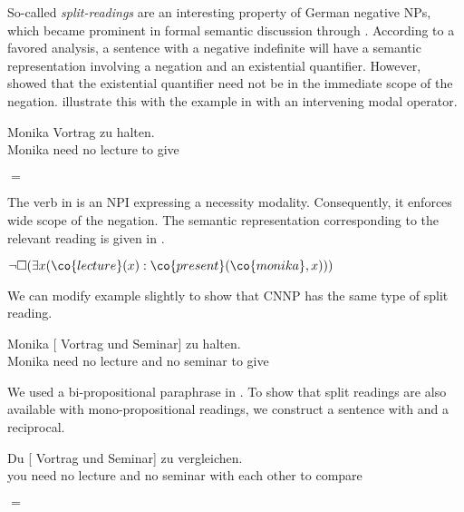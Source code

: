 \documentclass[output=paper]{langsci/langscibook}
\begin{document}
So-called \emph{split-readings} are an interesting property of German negative NPs, which became prominent in formal semantic discussion through \citet{Jacobs:80}. 
According to a favored analysis, a sentence with a negative indefinite will have a semantic representation involving a negation and an existential quantifier. 
However, \citet{Jacobs:80} showed that the existential quantifier need not be in the immediate scope of the negation. \citet{Penka:Stechow:01} illustrate this with the example in  with an intervening modal operator.

\ea \label{ex-tie}
\gll Monika   Vortrag zu halten.\\
Monika need no lecture to give\\
\glt {}\\
$=$ 
\z 

The verb  in  is an NPI expressing a necessity modality. Consequently, it enforces wide scope of the negation. The semantic representation corresponding to the relevant reading is given in .

\ea \label{ex-tie-lf}
$\lnot \Box (\exists x (\co{lecture}(x) : \co{present}(\co{monika},x)))$
\z 

We can modify example  slightly to show that CNNP has the same type of split reading.


\ea \label{ex-tie-conj}
\gll Monika  [ Vortrag und  Seminar] zu halten.\\
Monika need \hphantom{[}no lecture and no seminar to give\\
\glt 
{}
\z 

We used a bi-propositional paraphrase in . 
To show that split readings are also available with mono-propositional readings, we construct a sentence with  and a reciprocal.

\ea
\gll Du  [ Vortrag und  Seminar]  zu vergleichen.\\
you need \hphantom{[}no lecture and no seminar {with each other} to compare\\
\glt {}\\
$=$ 
\z 
\end{document}
